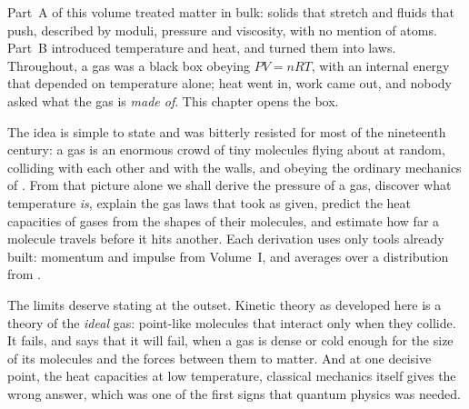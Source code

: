 
Part~A of this volume treated matter in bulk: solids that stretch and fluids that push, described by
moduli, pressure and viscosity, with no mention of atoms. Part~B introduced temperature and heat, and
 turned them into laws. Throughout, a gas was a black box obeying $PV=nRT$, with an
internal energy that depended on temperature alone; heat went in, work came out, and nobody asked what
the gas is \emph{made of}. This chapter opens the box.

The idea is simple to state and was bitterly resisted for most of the nineteenth century: a gas is an
enormous crowd of tiny molecules flying about at random, colliding with each other and with the walls,
and obeying the ordinary mechanics of . From that picture alone we shall
derive the pressure of a gas, discover what temperature \emph{is}, explain the gas laws that
 took as given, predict the heat capacities of gases from the shapes of their molecules,
and estimate how far a molecule travels before it hits another. Each derivation uses only tools already
built: momentum and impulse from Volume~I, and averages over a distribution from .

The limits deserve stating at the outset. Kinetic theory as developed here is a theory of the
\emph{ideal} gas: point-like molecules that interact only when they collide. It fails, and says that it
will fail, when a gas is dense or cold enough for the size of its molecules and the forces between them
to matter. And at one decisive point, the heat capacities at low temperature, classical mechanics itself
gives the wrong answer, which was one of the first signs that quantum physics was needed.


